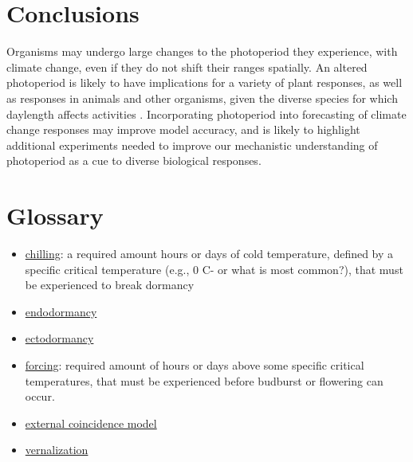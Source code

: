 \documentclass{article}
\begin{document}
\section*{Conclusions}
Organisms may undergo large changes to the photoperiod they experience, with climate change, even if they do not shift their ranges spatially. An altered photoperiod is likely to have implications for a variety of plant responses, as well as responses in animals and other organisms, given the diverse species for which daylength affects activities \citep[e.g.,][] {taranger2003,bradshaw2006,mcallan2006,linn1996,Flynn:2018,solbakken1994}. Incorporating photoperiod into forecasting of climate change responses may improve model accuracy, and is likely to highlight additional experiments needed to improve our mechanistic understanding of photoperiod as a cue to diverse biological responses. 
\section* {Glossary}
\begin{itemize}
\item \underline{chilling}: a required amount hours or days of cold temperature, defined by a specific critical temperature (e.g., 0 \degree C- or what is most common?), that must be experienced to break dormancy

\item \underline{endodormancy}
\item \underline{ectodormancy} 
\item \underline{forcing}: required amount of hours or days above some specific critical temperatures, that must be experienced before budburst or flowering can occur.
\item \underline{external coincidence model}
\item \underline{vernalization}
\end{itemize}
\end{document}
